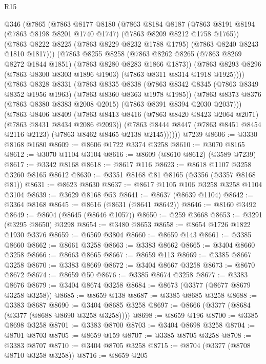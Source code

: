 \begin{lexlean}{R15}
\begin{coremodule}
    @346
      (@7865
        (@7863
          @8177
          @8180
          (@7863
            @8184
            @8187
            (@7863 @8191 @8194 (@7863 @8198 @8201 @1740 @1747) (@7863 @8209 @8212 @1758 @1765))
            (@7863 @8222 @8225 (@7863 @8229 @8232 @1788 @1795) (@7863 @8240 @8243 @1810 @1817)))
          (@7863
            @8255
            @8258
            (@7863 @8262 @8265 (@7863 @8269 @8272 @1844 @1851) (@7863 @8280 @8283 @1866 @1873))
            (@7863 @8293 @8296 (@7863 @8300 @8303 @1896 @1903) (@7863 @8311 @8314 @1918 @1925))))
        (@7863
          @8328
          @8331
          (@7863
            @8335
            @8338
            (@7863 @8342 @8345 (@7863 @8349 @8352 @1956 @1963) (@7863 @8360 @8363 @1978 @1985))
            (@7863 @8373 @8376 (@7863 @8380 @8383 @2008 @2015) (@7863 @8391 @8394 @2030 @2037)))
          (@7863
            @8406
            @8409
            (@7863 @8413 @8416 (@7863 @8420 @8423 @2064 @2071) (@7863 @8431 @8434 @2086 @2093))
            (@7863 @8444 @8447 (@7863 @8451 @8454 @2116 @2123) (@7863 @8462 @8465 @2138 @2145))))))
    @7239
@8606 := @3330 @8168 @1680
@8609 := @8606 @1722 @3374 @3258
@8610 := @3070 @8165
@8612 := @3070 @1104 @3104
@8616 := @8609 (@8610 @8612) (@3589 @7239)
@8617 := @3342 @8168
@8618 := @8617 @116
@8623 := @8618 @1107 @3258 @3260 @8165 @8612
@8630 := @3351 @8168 @81 @8165 (@3356 (@3357 @8168 @81))
@8631 := @8623 @8630
@8637 := @8617 @1105 @106 @3258 @3258 @1104 @3104
@8639 := @3629 @8168 @53
@8641 := @8637 (@8639 @1104)
@8642 := @3364 @8168
@8645 := @8616 (@8631 (@8641 @8642))
@8646 := @8160 @3492
@8649 := @8604 (@8645 (@8646 @1057))
@8650 := @259 @3668
@8653 := @3291 (@3295 @8650) @3298
@8654 := @3480 @8653
@8658 := @8654 @1726 @1822 @1930 @3376
@8659 := @6569 @3804
@8660 := @8659 @143
@8661 := @3385 @8660
@8662 := @8661 @3258
@8663 := @3383 @8662
@8665 := @3404 @8660 @3258
@8666 := @8663 @8665
@8667 := @8659 @113
@8669 := @3385 @8667 @3258
@8670 := @3383 @8669
@8672 := @3404 @8667 @3258
@8673 := @8670 @8672
@8674 := @8659 @50
@8676 := @3385 @8674 @3258
@8677 := @3383 @8676
@8679 := @3404 @8674 @3258
@8684 := @8673 (@3377 (@8677 @8679 @3258 @3258))
@8685 := @8659 @138
@8687 := @3385 @8685 @3258
@8688 := @3383 @8687
@8690 := @3404 @8685 @3258
@8697 := @8666 (@3377 (@8684 (@3377 (@8688 @8690 @3258 @3258))))
@8698 := @8659 @196
@8700 := @3385 @8698 @3258
@8701 := @3383 @8700
@8703 := @3404 @8698 @3258
@8704 := @8701 @8703
@8705 := @8659 @159
@8707 := @3385 @8705 @3258
@8708 := @3383 @8707
@8710 := @3404 @8705 @3258
@8715 := @8704 (@3377 (@8708 @8710 @3258 @3258))
@8716 := @8659 @205

\end{coremodule}
\end{lexlean}
